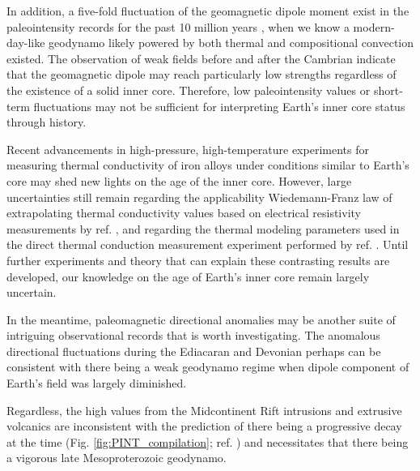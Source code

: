 \documentclass[9pt,twocolumn,twoside,lineno]{pnas-new}
\begin{document}
In addition, a five-fold fluctuation of the geomagnetic dipole moment exist in the paleointensity records for the past 10 million years \cite{Bono2021a}, when we know a modern-day-like geodynamo likely powered by both thermal and compositional convection existed. The observation of weak fields before and after the Cambrian indicate that the geomagnetic dipole may reach particularly low strengths regardless of the existence of a solid inner core. Therefore, low paleointensity values or short-term fluctuations may not be sufficient for interpreting Earth's inner core status through history.

Recent advancements in high-pressure, high-temperature experiments for measuring thermal conductivity of iron alloys under conditions similar to Earth's core may shed new lights on the age of the inner core. However, large uncertainties still remain regarding the applicability Wiedemann-Franz law of extrapolating thermal conductivity values based on electrical resistivity measurements by ref. \citealp{Ohta2016a}, and regarding the thermal modeling parameters used in the direct thermal conduction measurement experiment performed by ref. \citealp{Konopkova2016a}. Until further experiments and theory that can explain these contrasting results are developed, our knowledge on the age of Earth's inner core remain largely uncertain. 

In the meantime, paleomagnetic directional anomalies may be another suite of intriguing observational records that is worth investigating. The anomalous directional fluctuations during the Ediacaran and Devonian \cite{Bono2015a, Kodama2021a, Shcherbakova2019a} perhaps can be consistent with there being a weak geodynamo regime when dipole component of Earth's field was largely diminished. 

Regardless, the high values from the Midcontinent Rift intrusions and extrusive volcanics are inconsistent with the prediction of there being a progressive decay at the time (Fig. \ref{fig:PINT_compilation}; ref. \citealp{Bono2019a}) and necessitates that there being a vigorous late Mesoproterozoic geodynamo. 




\end{document}
